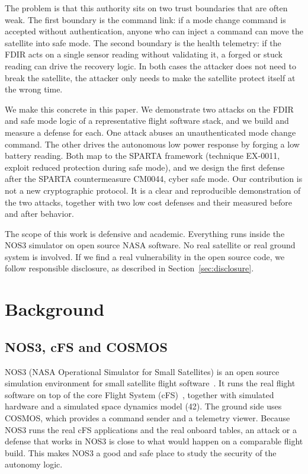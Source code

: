 \documentclass[conference,letterpaper,10pt]{IEEEtran}
\begin{document}
The problem is that this authority sits on two trust boundaries that are often weak. The first boundary is the command link: if a mode change command is accepted without authentication, anyone who can inject a command can move the satellite into safe mode. The second boundary is the health telemetry: if the FDIR acts on a single sensor reading without validating it, a forged or stuck reading can drive the recovery logic. In both cases the attacker does not need to break the satellite, the attacker only needs to make the satellite protect itself at the wrong time.

We make this concrete in this paper. We demonstrate two attacks on the FDIR and safe mode logic of a representative flight software stack, and we build and measure a defense for each. One attack abuses an unauthenticated mode change command. The other drives the autonomous low power response by forging a low battery reading. Both map to the SPARTA framework (technique EX-0011, exploit reduced protection during safe mode), and we design the first defense after the SPARTA countermeasure CM0044, cyber safe mode. Our contribution is not a new cryptographic protocol. It is a clear and reproducible demonstration of the two attacks, together with two low cost defenses and their measured before and after behavior.

The scope of this work is defensive and academic. Everything runs inside the NOS3 simulator on open source NASA software. No real satellite or real ground system is involved. If we find a real vulnerability in the open source code, we follow responsible disclosure, as described in Section~\ref{sec:disclosure}.

\section{Background}

\subsection{NOS3, cFS and COSMOS}
NOS3 (NASA Operational Simulator for Small Satellites) is an open source simulation environment for small satellite flight software~\cite{nos3}. It runs the real flight software on top of the core Flight System (cFS)~\cite{cfs}, together with simulated hardware and a simulated space dynamics model (42). The ground side uses COSMOS, which provides a command sender and a telemetry viewer. Because NOS3 runs the real cFS applications and the real onboard tables, an attack or a defense that works in NOS3 is close to what would happen on a comparable flight build. This makes NOS3 a good and safe place to study the security of the autonomy logic.
\end{document}

